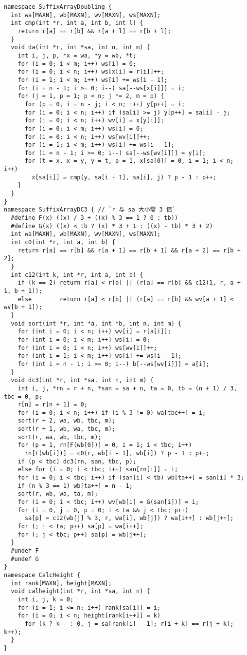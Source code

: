 \begin{lstlisting}
namespace SuffixArrayDoubling {
  int wa[MAXN], wb[MAXN], wv[MAXN], ws[MAXN];
  int cmp(int *r, int a, int b, int l) {
    return r[a] == r[b] && r[a + l] == r[b + l];
  }
  void da(int *r, int *sa, int n, int m) {
    int i, j, p, *x = wa, *y = wb, *t;
    for (i = 0; i < m; i++) ws[i] = 0;
    for (i = 0; i < n; i++) ws[x[i] = r[i]]++;
    for (i = 1; i < m; i++) ws[i] += ws[i - 1];
    for (i = n - 1; i >= 0; i--) sa[--ws[x[i]]] = i;
    for (j = 1, p = 1; p < n; j *= 2, m = p) {
      for (p = 0, i = n - j; i < n; i++) y[p++] = i;
      for (i = 0; i < n; i++) if (sa[i] >= j) y[p++] = sa[i] - j;
      for (i = 0; i < n; i++) wv[i] = x[y[i]];
      for (i = 0; i < m; i++) ws[i] = 0;
      for (i = 0; i < n; i++) ws[wv[i]]++;
      for (i = 1; i < m; i++) ws[i] += ws[i - 1];
      for (i = n - 1; i >= 0; i--) sa[--ws[wv[i]]] = y[i];
      for (t = x, x = y, y = t, p = 1, x[sa[0]] = 0, i = 1; i < n; i++)
        x[sa[i]] = cmp(y, sa[i - 1], sa[i], j) ? p - 1 : p++;
    }
  }
}
namespace SuffixArrayDC3 { // `r 与 sa 大小需 3 倍`
  #define F(x) ((x) / 3 + ((x) % 3 == 1 ? 0 : tb))
  #define G(x) ((x) < tb ? (x) * 3 + 1 : ((x) - tb) * 3 + 2)
  int wa[MAXN], wb[MAXN], wv[MAXN], ws[MAXN];
  int c0(int *r, int a, int b) {
    return r[a] == r[b] && r[a + 1] == r[b + 1] && r[a + 2] == r[b + 2];
  }
  int c12(int k, int *r, int a, int b) {
    if (k == 2) return r[a] < r[b] || (r[a] == r[b] && c12(1, r, a + 1, b + 1));
    else        return r[a] < r[b] || (r[a] == r[b] && wv[a + 1] < wv[b + 1]);
  }
  void sort(int *r, int *a, int *b, int n, int m) {
    for (int i = 0; i < n; i++) wv[i] = r[a[i]];
    for (int i = 0; i < m; i++) ws[i] = 0;
    for (int i = 0; i < n; i++) ws[wv[i]]++;
    for (int i = 1; i < m; i++) ws[i] += ws[i - 1];
    for (int i = n - 1; i >= 0; i--) b[--ws[wv[i]]] = a[i];
  }
  void dc3(int *r, int *sa, int n, int m) {
    int i, j, *rn = r + n, *san = sa + n, ta = 0, tb = (n + 1) / 3, tbc = 0, p;
    r[n] = r[n + 1] = 0;
    for (i = 0; i < n; i++) if (i % 3 != 0) wa[tbc++] = i;
    sort(r + 2, wa, wb, tbc, m);
    sort(r + 1, wb, wa, tbc, m);
    sort(r, wa, wb, tbc, m);
    for (p = 1, rn[F(wb[0])] = 0, i = 1; i < tbc; i++)
      rn[F(wb[i])] = c0(r, wb[i - 1], wb[i]) ? p - 1 : p++;
    if (p < tbc) dc3(rn, san, tbc, p);
    else for (i = 0; i < tbc; i++) san[rn[i]] = i;
    for (i = 0; i < tbc; i++) if (san[i] < tb) wb[ta++] = san[i] * 3;
    if (n % 3 == 1) wb[ta++] = n - 1;
    sort(r, wb, wa, ta, m);
    for (i = 0; i < tbc; i++) wv[wb[i] = G(san[i])] = i;
    for (i = 0, j = 0, p = 0; i < ta && j < tbc; p++)
      sa[p] = c12(wb[j] % 3, r, wa[i], wb[j]) ? wa[i++] : wb[j++];
    for (; i < ta; p++) sa[p] = wa[i++];
    for (; j < tbc; p++) sa[p] = wb[j++];
  }
  #undef F
  #undef G
}
namespace CalcHeight {
  int rank[MAXN], height[MAXN];
  void calheight(int *r, int *sa, int n) {
    int i, j, k = 0;
    for (i = 1; i <= n; i++) rank[sa[i]] = i;
    for (i = 0; i < n; height[rank[i++]] = k)
      for (k ? k-- : 0, j = sa[rank[i] - 1]; r[i + k] == r[j + k]; k++);
  }
}
\end{lstlisting}